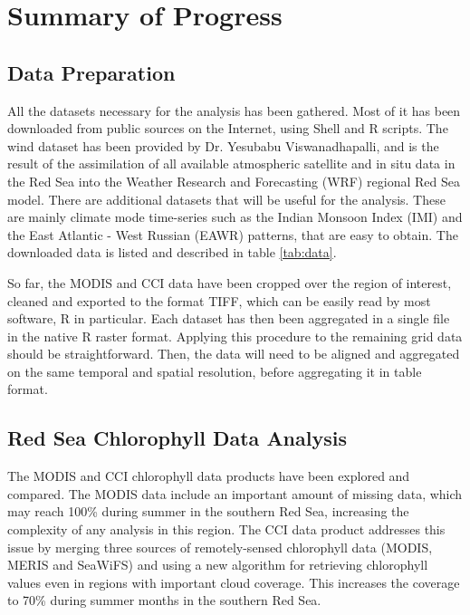 \chapter{Summary of Progress}

\section{Data Preparation}

All the datasets necessary for the analysis has been gathered. Most of it has
been downloaded from public sources on the Internet, using Shell and R scripts.
The wind dataset has been provided by Dr. Yesubabu Viswanadhapalli, and is the
result of the assimilation of all available atmospheric satellite and in situ
data in the Red Sea into the Weather Research and Forecasting (WRF) regional
Red Sea model. There are additional datasets that will be useful for the
analysis. These are mainly climate mode time-series such as the Indian Monsoon
Index (IMI) and the East Atlantic - West Russian (EAWR) patterns, that are easy
to obtain. The downloaded data is listed and described in table \ref{tab:data}.

So far, the MODIS and CCI data have been cropped over the region of interest,
cleaned and exported to the format TIFF, which can be easily read by most
software, R in particular. Each dataset has then been aggregated in a single
file in the native R raster format. Applying this procedure to the remaining
grid data should be straightforward. Then, the data will need to be aligned
and aggregated on the same temporal and spatial resolution, before aggregating
it in table format.



\section{Red Sea Chlorophyll Data Analysis}

The MODIS and CCI chlorophyll data products have been explored and compared.
The MODIS data include an important amount of missing data, which may reach
100\% during summer in the southern Red Sea, increasing the complexity of any
analysis in this region. The CCI data product addresses this issue by merging
three sources of remotely-sensed chlorophyll data (MODIS, MERIS and SeaWiFS)
and using a new algorithm for retrieving chlorophyll values even in regions
with important cloud coverage. This increases the coverage to 70\% during 
summer months
in the southern Red Sea.

